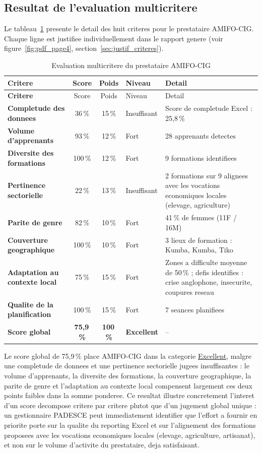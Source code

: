 \documentclass[12pt,a4paper,twoside,openany]{report}
\begin{document}
\subsection{Resultat de l'evaluation multicritere}

Le tableau~\ref{tab:criteres_amifo} presente le detail des huit criteres pour le prestataire AMIFO-CIG. Chaque ligne est justifiee individuellement dans le rapport genere (voir figure~\ref{fig:pdf_page4}, section~\ref{sec:justif_criteres}).

\begin{longtable}{>{\bfseries}p{4cm} c c l p{5cm}}
\caption{Evaluation multicritere du prestataire AMIFO-CIG}
\label{tab:criteres_amifo} \\
\toprule
Critere & Score & Poids & Niveau & Detail \\
\midrule
\endfirsthead
\toprule
Critere & Score & Poids & Niveau & Detail \\
\midrule
\endhead
Completude des donnees & 36\,\% & 15\,\% & Insuffisant & Score de completude Excel : 25,8\,\% \\
Volume d'apprenants & 93\,\% & 12\,\% & Fort & 28 apprenants detectes \\
Diversite des formations & 100\,\% & 12\,\% & Fort & 9 formations identifiees \\
Pertinence sectorielle & 22\,\% & 13\,\% & Insuffisant & 2 formations sur 9 alignees avec les vocations economiques locales (elevage, agriculture) \\
Parite de genre & 82\,\% & 10\,\% & Fort & 41\,\% de femmes (11F / 16M) \\
Couverture geographique & 100\,\% & 10\,\% & Fort & 3 lieux de formation : Kumba, Kumba, Tiko \\
Adaptation au contexte local & 75\,\% & 15\,\% & Fort & Zones a difficulte moyenne de 50\,\% ; defis identifies : crise anglophone, insecurite, coupures reseau \\
Qualite de la planification & 100\,\% & 15\,\% & Fort & 7 seances planifiees \\
\midrule
\textbf{Score global} & \textbf{75,9\,\%} & \textbf{100\,\%} & \textbf{Excellent} & -- \\
\bottomrule
\end{longtable}

Le score global de 75,9\,\% place AMIFO-CIG dans la categorie \hyperref[sec:justif_criteres]{Excellent}, malgre une completude de donnees et une pertinence sectorielle jugees insuffisantes : le volume d'apprenants, la diversite des formations, la couverture geographique, la parite de genre et l'adaptation au contexte local compensent largement ces deux points faibles dans la somme ponderee. Ce resultat illustre concretement l'interet d'un score decompose critere par critere plutot que d'un jugement global unique : un gestionnaire PADESCE peut immediatement identifier que l'effort a fournir en priorite porte sur la qualite du reporting Excel et sur l'alignement des formations proposees avec les vocations economiques locales (elevage, agriculture, artisanat), et non sur le volume d'activite du prestataire, deja satisfaisant.
\end{document}
